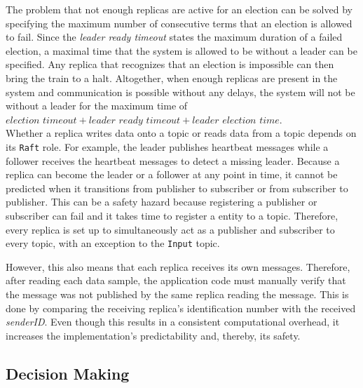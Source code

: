 The problem that not enough replicas are active for an election can be solved by specifying the maximum number of consecutive terms that an election is allowed to fail.
Since the \textit{leader ready timeout} states the maximum duration of a failed election, a maximal time that the system is allowed to be without a leader can be specified.
Any replica that recognizes that an election is impossible can then bring the train to a halt.
Altogether, when enough replicas are present in the system and communication is possible without any delays, the system will not be without a leader for the maximum time of $\textit{election timeout} + \textit{leader ready timeout} + \textit{leader election time}$.
\\

\noindent
Whether a replica writes data onto a topic or reads data from a topic depends on its \texttt{Raft} role.
For example, the leader publishes heartbeat messages while a follower receives the heartbeat messages to detect a missing leader.
Because a replica can become the leader or a follower at any point in time, it cannot be predicted when it transitions from publisher to subscriber or from subscriber to publisher.
This can be a safety hazard because registering a publisher or subscriber can fail and it takes time to register a  entity to a topic.
Therefore, every replica is set up to simultaneously act as a publisher and subscriber to every topic, with an exception to the \texttt{Input} topic.

However, this also means that each replica receives its own messages.
Therefore, after reading each data sample, the application code must manually verify that the message was not published by the same replica reading the message.
This is done by comparing the receiving replica's identification number with the received \textit{senderID}.
Even though this results in a consistent computational overhead, it increases the implementation's predictability and, thereby, its safety.

\subsection{Decision Making}
\label{subsec:ImpInputProcessing}

